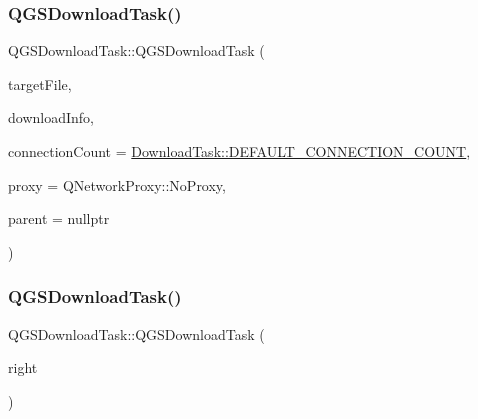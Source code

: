 \subsubsection{\texorpdfstring{Q\+G\+S\+Download\+Task()}{QGSDownloadTask()}\hspace{0.1cm}{\footnotesize\ttfamily [2/4]}}
{\footnotesize\ttfamily Q\+G\+S\+Download\+Task\+::\+Q\+G\+S\+Download\+Task (\begin{DoxyParamCaption}\item[{Q\+File $\ast$}]{target\+File,  }\item[{const \mbox{\hyperlink{class_q_g_s_download_info}{Q\+G\+S\+Download\+Info}} \&}]{download\+Info,  }\item[{int}]{connection\+Count = {\ttfamily \mbox{\hyperlink{namespace_download_task_aaa57d3178f399d1c5ba47d41cd38bb8e}{Download\+Task\+::\+D\+E\+F\+A\+U\+L\+T\+\_\+\+C\+O\+N\+N\+E\+C\+T\+I\+O\+N\+\_\+\+C\+O\+U\+NT}}},  }\item[{const Q\+Network\+Proxy \&}]{proxy = {\ttfamily QNetworkProxy\+:\+:NoProxy},  }\item[{Q\+Object $\ast$}]{parent = {\ttfamily nullptr} }\end{DoxyParamCaption})}

\mbox{\label{class_q_g_s_download_task_aa01677c7af9669e07ccb12bd91654947}} 
\subsubsection{\texorpdfstring{Q\+G\+S\+Download\+Task()}{QGSDownloadTask()}\hspace{0.1cm}{\footnotesize\ttfamily [3/4]}}
{\footnotesize\ttfamily Q\+G\+S\+Download\+Task\+::\+Q\+G\+S\+Download\+Task (\begin{DoxyParamCaption}\item[{const \mbox{\hyperlink{class_q_g_s_download_task}{Q\+G\+S\+Download\+Task}} \&}]{right }\end{DoxyParamCaption})\hspace{0.3cm}{\ttfamily [delete]}}

\mbox{\label{class_q_g_s_download_task_a095ed01a4cdc1ac9cb1db6ca572d839c}} 
